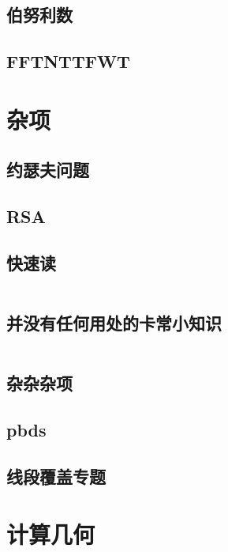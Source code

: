 \documentclass[a4paper,11pt]{article}
\begin{document}
    \subsection{伯努利数}
    

    \subsection{FFTNTTFWT}
    


    \newpage
    \section{杂项}

    \subsection{约瑟夫问题}
    

    \subsection{RSA}
    

    \subsection{快速读}
    \inputminted[breaklines]{c++}{Others/quick_IO.cpp}

    \subsection{并没有任何用处的卡常小知识}
    \inputminted[breaklines]{c++}{Others/并没有任何用处的卡常小知识.cpp}

    \subsection{杂杂杂项}
    

    \subsection{pbds}
    
    
     \subsection{线段覆盖专题}
    




    \newpage
    \section{计算几何}


\end{document}
